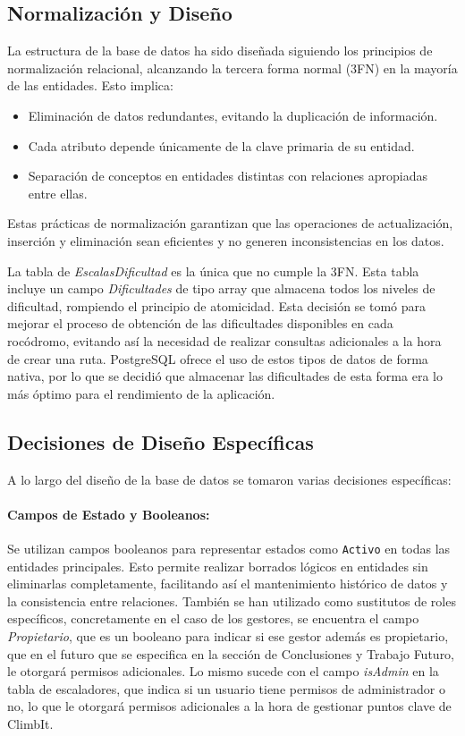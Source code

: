 \subsection{Normalización y Diseño}

La estructura de la base de datos ha sido diseñada siguiendo los principios de normalización relacional, alcanzando 
la tercera forma normal (3FN) en la mayoría de las entidades. Esto implica:

\begin{itemize}
    \item Eliminación de datos redundantes, evitando la duplicación de información.
    \item Cada atributo depende únicamente de la clave primaria de su entidad.
    \item Separación de conceptos en entidades distintas con relaciones apropiadas entre ellas.
\end{itemize}

Estas prácticas de normalización garantizan que las operaciones de actualización, inserción y eliminación sean eficientes 
y no generen inconsistencias en los datos.

La tabla de \textit{EscalasDificultad} es la única que no cumple la 3FN. Esta tabla incluye un campo \textit{Dificultades} de tipo array que almacena todos los niveles
de dificultad, rompiendo el principio de atomicidad. Esta decisión se tomó para mejorar el proceso de obtención de las dificultades disponibles en cada rocódromo, 
evitando así la necesidad de realizar consultas adicionales a la hora de crear una ruta. PostgreSQL ofrece el uso de estos tipos de datos de forma nativa, 
por lo que se decidió que almacenar las dificultades de esta forma era lo más óptimo para el rendimiento de la aplicación.

\subsection{Decisiones de Diseño Específicas}

A lo largo del diseño de la base de datos se tomaron varias decisiones específicas:

\paragraph{Campos de Estado y Booleanos:} Se utilizan campos booleanos para representar estados como \texttt{Activo} en todas las entidades principales. Esto permite
realizar borrados lógicos en entidades sin eliminarlas completamente, facilitando así el mantenimiento histórico de datos y la consistencia entre relaciones. También
se han utilizado como sustitutos de roles específicos, concretamente en el caso de los gestores, se encuentra el campo \textit{Propietario}, que es un booleano para indicar 
si ese gestor además es propietario, que en el futuro que se especifica en la sección de Conclusiones y Trabajo Futuro, le otorgará permisos adicionales. Lo mismo 
sucede con el campo \textit{isAdmin} en la tabla de escaladores, que indica si un usuario tiene permisos de administrador o no, lo que le otorgará permisos adicionales
a la hora de gestionar puntos clave de ClimbIt.

